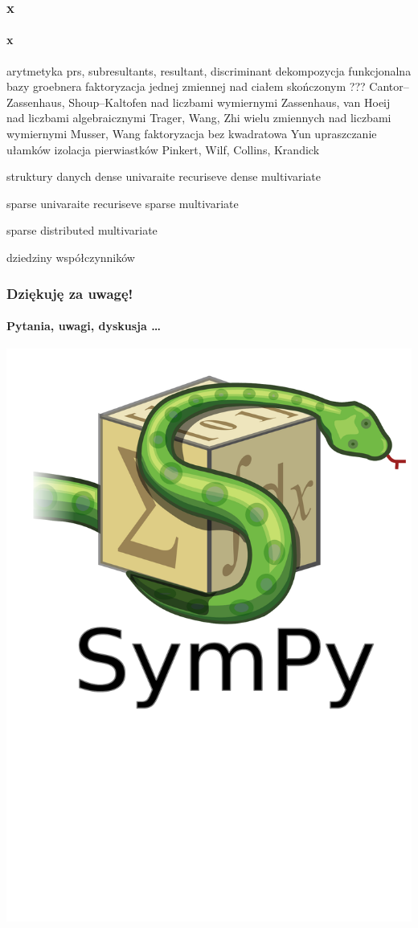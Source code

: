 \documentclass{beamer}
\begin{document}
\begin{frame}
    \frametitle{x}
    \framesubtitle{x}


    arytmetyka
    prs, subresultants, resultant, discriminant
    dekompozycja funkcjonalna
    bazy groebnera
    faktoryzacja
        jednej zmiennej
            nad ciałem skończonym
                ???
                Cantor--Zassenhaus, Shoup--Kaltofen
            nad liczbami wymiernymi
                Zassenhaus, van Hoeij
            nad liczbami algebraicznymi
                Trager, Wang, Zhi
        wielu zmiennych
            nad liczbami wymiernymi
                Musser, Wang
    faktoryzacja bez kwadratowa
        Yun
    upraszczanie ułamków
    izolacja pierwiastków
        Pinkert, Wilf,
        Collins, Krandick

    struktury danych
        dense univaraite
        recuriseve dense multivariate

        sparse univaraite
        recuriseve sparse multivariate

        sparse distributed multivariate

    dziedziny współczynników

\end{frame}

\begin{frame}
    \frametitle{Dziękuję za uwagę!}
    \framesubtitle{Pytania, uwagi, dyskusja \ldots}

    \begin{center}
        \includegraphics[scale=0.2]{images/sympy-logo.pdf}
    \end{center}
\end{frame}
\end{document}
